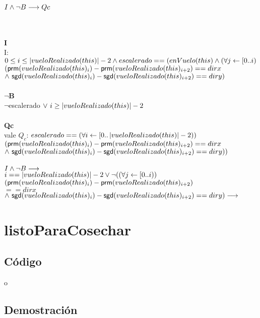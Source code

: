 \documentclass[a4paper]{article}
\begin{document}
        \begin{Large}
        {$I \land \neg B \longrightarrow Qc$}
        \end{Large}\\
        \\
        \textbf{I}\\
		I: $ 0 \leq i \leq \left| vueloRealizado(this) \right| -2 \land escalerado == (enVuelo(this) \land (\forall j \leftarrow [0..i) $ $ (\mathsf{prm}(vueloRealizado(this)_i) - \mathsf{prm}(vueloRealizado(this)_{i+2}) == dirx $ $ \land \ \mathsf{sgd}(vueloRealizado(this)_i) - \mathsf{sgd}(vueloRealizado(this)_{i+2}) == diry) $\\
        \\
        \textbf{$\neg$B}\\
        $\neg$escalerado$ \ \vee \ i \geq \left| vueloRealizado(this) \right| - 2$\\
        \\ 
        \textbf{Qc}\\ 
        vale $Q_c$: $ escalerado == (\forall i \leftarrow [0..\left| vueloRealizado(this) \right| - 2)) $ $ (\mathsf{prm}(vueloRealizado(this)_i) - \mathsf{prm}(vueloRealizado(this)_{i+2}) == dirx $ $ \land \ \mathsf{sgd}(vueloRealizado(this)_i) - \mathsf{sgd}(vueloRealizado(this)_{i+2}) == diry)) $ \\ 
        \\ $I \land \neg B \longrightarrow $\\ 
        $i == \left| vueloRealizado(this) \right| -2 \vee \neg ((\forall j \leftarrow [0..i)) $\\ $ (\mathsf{prm}(vueloRealizado(this)_i) - \mathsf{prm}(vueloRealizado(this)_{i+2})$\\$ == dirx $ $ \land \ \mathsf{sgd}(vueloRealizado(this)_i) - \mathsf{sgd}(vueloRealizado(this)_{i+2}) == diry) \longrightarrow $\\ 
        $  $ 

\newpage

\section{listoParaCosechar}

    \subsection{C\'odigo}
    o

    \subsection{Demostraci\'on}
        \noindent
       
\end{document}
